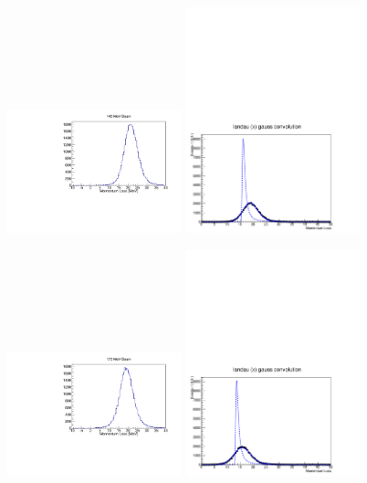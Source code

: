 \begin{figure}
\includegraphics[width=0.45\textwidth]{11-Absorber/Figures/raw_140.pdf}\hfil
\includegraphics[width=0.45\textwidth]{11-Absorber/Figures/deconv_140.pdf}
\vspace{-5cm}

\includegraphics[width=0.45\textwidth]{11-Absorber/Figures/raw_170.pdf}\hfil
\includegraphics[width=0.45\textwidth]{11-Absorber/Figures/deconv_170.pdf}
\vspace{-5cm}


\end{figure}
